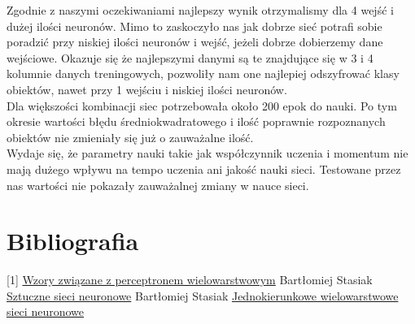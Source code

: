 \documentclass[12pt]{article}
\begin{document}
Zgodnie z naszymi oczekiwaniami najlepszy wynik otrzymalismy dla 4 wejść i dużej ilości neuronów. Mimo to zaskoczyło nas jak dobrze sieć potrafi sobie poradzić przy niskiej ilości neuronów i wejść, jeżeli dobrze dobierzemy dane wejściowe. Okazuje się że najlepszymi danymi są te znajdujące się w 3 i 4 kolumnie danych treningowych, pozwoliły nam one najlepiej odszyfrować klasy obiektów, nawet przy 1 wejściu i niskiej ilości neuronów.\\ Dla większości kombinacji siec potrzebowała około 200 epok do nauki. Po tym okresie wartości błędu średniokwadratowego i ilość poprawnie rozpoznanych obiektów nie zmieniały się już o zauważalne ilość.\\Wydaje się, że parametry nauki takie jak współczynnik uczenia i momentum nie mają dużego wpływu na tempo uczenia ani jakość nauki sieci. Testowane przez nas wartości nie pokazały zauważalnej zmiany w nauce sieci.

\section {Bibliografia}

[1] \href{https://ftims.edu.p.lodz.pl/pluginfile.php/137799/mod_resource/content/7/perceptron.pdf}{Wzory związane z perceptronem wielowarstwowym}
\newline
[2] Bartłomiej Stasiak \href{https://ftims.edu.p.lodz.pl/pluginfile.php/137980/mod_resource/content/1/3.pdf}{Sztuczne sieci neuronowe}
\newline
[3] Bartłomiej Stasiak \href{https://ftims.edu.p.lodz.pl/pluginfile.php/137981/mod_resource/content/2/4.pdf}{Jednokierunkowe wielowarstwowe sieci neuronowe}











\renewcommand\refname{Bibliografia}


\end{document}
